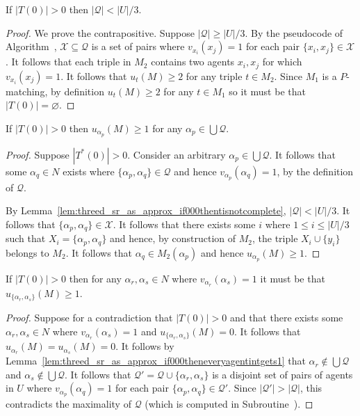 \begin{lem}
\label{lem:threed_sr_as_approx_if000thentisnotcomplete}
If $|T(0)| > 0$ then $|\mathcal{Q}| < |U|/3$.
\end{lem}
\begin{proof}
We prove the contrapositive. Suppose $|\mathcal{Q}| \geq |U|/3$. By the pseudocode of Algorithm~, $\mathcal{X}\subseteq \mathcal{Q}$ is a set of pairs where $v_{x_i}(x_j)=1$ for each pair $\{ x_i, x_j \} \in \mathcal{X}$. It follows that each triple in $M_2$ contains two agents $x_i, x_j$ for which $v_{x_i}(x_j)=1$. It follows that $u_{t}(M) \geq 2$ for any triple $t \in M_2$. Since $M_1$ is a $P$\nobreakdash-matching, by definition  $u_{t}(M) \geq 2$ for any $t \in M_1$ so it must be that $|T(0)| = \varnothing$.
\end{proof}

\begin{lem}
\label{lem:threed_sr_as_approx_if000theneveryagentintgets1}
If $|T(0)| > 0$ then $u_{\alpha_p}(M) \geq 1$ for any $\alpha_p \in \bigcup \mathcal{Q}$.
\end{lem}
\begin{proof}
Suppose $|T^*(0)|>0$. Consider an arbitrary $\alpha_p \in \bigcup \mathcal{Q}$. It follows that some $\alpha_q\in N$ exists where $\{ \alpha_p, \alpha_q \}\in \mathcal{Q}$ and hence $v_{\alpha_p}(\alpha_q)=1$, by the definition of $\mathcal{Q}$. 

By Lemma~\ref{lem:threed_sr_as_approx_if000thentisnotcomplete}, $|\mathcal{Q}| < |U|/3$. It follows that $\{ \alpha_p, \alpha_q \} \in \mathcal{X}$. It follows that there exists some $i$ where $1 \leq i \leq |U|/3$ such that $X_i = \{ \alpha_p, \alpha_q \}$ and hence, by construction of $M_2$, the triple $X_i \cup \{ y_i \}$ belongs to $M_2$. It follows that $\alpha_q\in M_2(\alpha_p)$ and hence $u_{\alpha_p}(M)\geq 1$.
\end{proof}

\begin{lem}
\label{lem:threed_sr_as_000exists_stlemma}
If $|T(0)|>0$ then for any $\alpha_r, \alpha_s \in N$ where $v_{\alpha_r}(\alpha_s) = 1$ it must be that $u_{\{ \alpha_r, \alpha_s\}}(M) \geq 1$.
\end{lem}
\begin{proof}
Suppose for a contradiction that $|T(0)| > 0$ and that there exists some $\alpha_r, \alpha_s \in N$ where $v_{\alpha_r}(\alpha_s)=1$ and $u_{\{ \alpha_r, \alpha_s\}}(M) = 0$. It follows that $u_{\alpha_r}(M) = u_{\alpha_s}(M) = 0$. It follows by Lemma~\ref{lem:threed_sr_as_approx_if000theneveryagentintgets1} that $\alpha_r \notin \bigcup \mathcal{Q}$ and $\alpha_s \notin \bigcup \mathcal{Q}$. It follows that $\mathcal{Q}' = \mathcal{Q} \cup \{ \alpha_r, \alpha_s \}$ is a disjoint set of pairs of agents in $U$ where $v_{\alpha_p}(\alpha_q)=1$ for each pair $\{ \alpha_p, \alpha_q \} \in \mathcal{Q}'$. Since $|\mathcal{Q}'|>|\mathcal{Q}|$, this contradicts the maximality of $\mathcal{Q}$ (which is computed in Subroutine~).
\end{proof}

